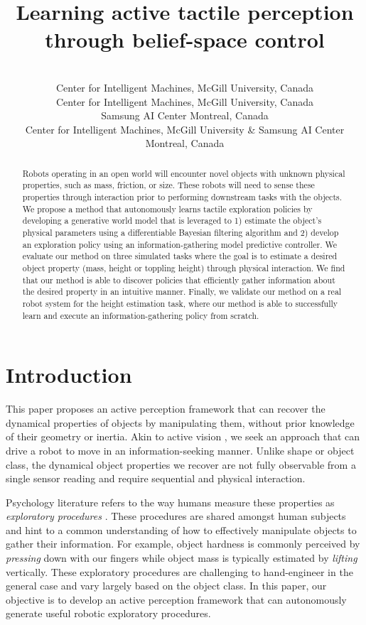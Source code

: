 \documentclass[anon]{l4dc2024}
\title[Active tactile perception]{Learning active tactile perception through belief-space control}
\author{%
 \Name{Jean-Fran\c{c}ois Tremblay} \Email{jft@cim.mcgill.ca}\\
 \addr Center for Intelligent Machines, McGill University, Canada
 \AND
 \Name{David Meger} \\
 \addr Center for Intelligent Machines, McGill University, Canada
 \AND
 \Name{Francois Hogan} \\
 \addr Samsung AI Center Montreal, Canada
 \AND
 \Name{Gregory Dudek} \\
 \addr Center for Intelligent Machines, McGill University \& Samsung AI Center Montreal, Canada
}
\begin{document}
\maketitle

\begin{abstract}
    Robots operating in an open world will encounter novel objects with unknown physical properties, such as mass, friction, or size.
    These robots will need to sense these properties through interaction prior to performing downstream tasks with the objects.
    We propose a method that autonomously learns tactile exploration policies by developing a generative world model that is leveraged to 1) estimate the object's physical parameters using a differentiable Bayesian filtering algorithm and 2) develop an exploration policy using an information-gathering model predictive controller.
    We evaluate our method on three simulated tasks where the goal is to estimate a desired object property (mass, height or toppling height) through physical interaction.
    We find that our method is able to discover policies that efficiently gather information about the desired property in an intuitive manner.
    Finally, we validate our method on a real robot system for the height estimation task, where our method is able to successfully learn and execute an information-gathering policy from scratch.
\end{abstract}

\section{Introduction}


This paper proposes an active perception framework that can recover the dynamical properties of objects by manipulating them, without prior knowledge of their geometry or inertia.
Akin to active vision \citep{activevision}, we seek an approach that can drive a robot to move in an information-seeking manner.
Unlike shape or object class, the dynamical object properties we recover are not fully observable from a single  sensor reading and require sequential and physical interaction.

Psychology literature refers to the way humans measure these properties as \textit{exploratory procedures} \citep{LEDERMAN1987342}.
These procedures are shared amongst human subjects and hint to a common understanding of how to effectively manipulate objects to gather their information.
For example, object hardness is commonly perceived by \textit{pressing} down with our fingers while object mass is typically estimated by \textit{lifting} vertically. %
These exploratory procedures are challenging to hand-engineer in the general case and vary largely based on the object class. In this paper, our objective is to develop an active perception framework that can autonomously generate useful robotic exploratory procedures.
\end{document}
